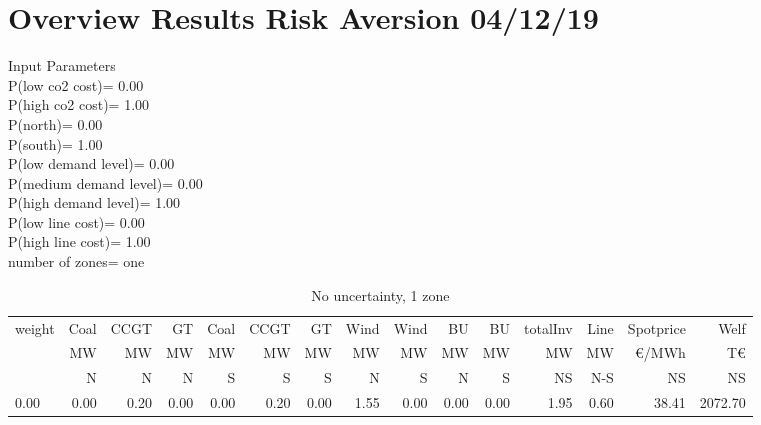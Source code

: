 \documentclass[landscape]{article}
\begin{document}
\section*{Overview Results Risk Aversion 04/12/19}
Input Parameters\\
P(low co2 cost)=         0.00\\
P(high co2 cost)=         1.00\\
P(north)=         0.00\\
P(south)=         1.00\\
P(low demand level)=         0.00\\
P(medium demand level)=         0.00\\
P(high demand level)=         1.00\\
P(low line cost)=         0.00\\
P(high line cost)=         1.00\\
number of zones= one\\
\begin{table}[htb]\caption{No uncertainty, 1 zone}
\begin{tabular}{l|rrrrrr|rr|rr|rr|rr}
\toprule
 weight &    Coal &     CCGT &      GT &   Coal  &   CCGT &      GT &    Wind &    Wind  &  BU  &  BU  & totalInv  &    Line   &  Spotprice   &  Welf   \\
        &      MW &       MW &      MW &      MW &     MW &      MW &      MW &      MW  &  MW  &  MW  &    MW     &    MW     &  \euro/MWh &  T\euro   \\
        &       N &       N  &      N  &      S  &      S &       S &       N &       S  &  N   &  S   &    NS     &    N-S    &  NS      &   NS    \\
\midrule
        0.00&        0.00&        0.20&        0.00&        0.00&        0.20&        0.00&        1.55&        0.00&        0.00&        0.00&        1.95&        0.60&       38.41&     2072.70\\
\bottomrule
\end{tabular}
\end{table}
\end{document}
